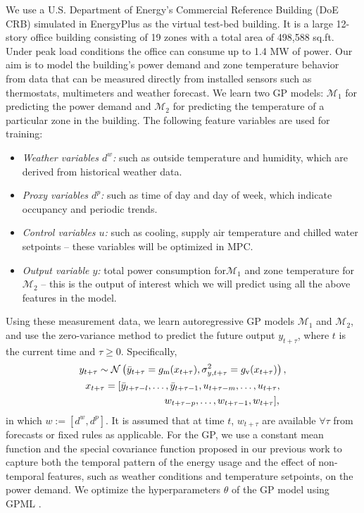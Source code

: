 We use a U.S. Department of Energy’s Commercial Reference Building (DoE CRB) simulated in EnergyPlus as the virtual test-bed building. It is a large 12-story office building consisting of 19 zones with a total area of 498,588 sq.ft. Under peak load conditions the office can consume up to 1.4 MW of power.
Our aim is to model the building's power demand and zone temperature behavior from data that can be measured directly from installed sensors such as thermostats, multimeters and weather forecast.
We learn two GP models: \(\mathcal{M}_1\) for predicting the power demand and \(\mathcal{M}_2\) for predicting the temperature of a particular zone in the building.
The following feature variables are used for training:
\begin{itemize}
\item \textit{Weather variables \(d^w\):} such as outside temperature and humidity, which are derived from historical weather data.
\item \textit{Proxy variables \(d^p\):} such as time of day and day of week, which indicate occupancy and periodic trends.
\item \textit{Control variables \(u\):} such as cooling, supply air temperature and chilled water setpoints -- these variables will be optimized in MPC.
\item \textit{Output variable \(y\):} total power consumption for\(\mathcal{M}_1\) and zone temperature for \(\mathcal{M}_2\) -- this is the output of interest which we will predict using all the above features in the model.
\end{itemize}

Using these measurement data, we learn autoregressive GP models \(\mathcal{M}_1\) and \(\mathcal{M}_2\), and use the zero-variance method to predict the future output \(y_{t+\tau}\), where $t$ is the current time and \( \tau \ge 0\).
Specifically,
\begin{gather}
\label{eq:dpc:prediction}
y_{t+\tau} \sim \operatorname*{\mathcal{N}}\left(\bar{y}_{t+\tau} = g_{\mathrm m}(x_{t+\tau}), \sigma^2_{y, t+\tau} = g_{\mathrm v}(x_{t+\tau})\right), \\
x_{t + \tau} = [\bar y_{t+ \tau-l}, \dots, \bar y_{t+ \tau-1}, u_{t+ \tau-m}, \dots, u_{t+ \tau}, \nonumber \\
\qquad\qquad\qquad\qquad  w_{t+ \tau-p}, \dots, w_{t+ \tau-1}, w_{t+ \tau}]\text, \nonumber
\end{gather}
in which \(w:=[d^w, d^p]\).
It is assumed that at time \(t\), \(w_{t+\tau}\) are available \(\forall \tau \) from forecasts or fixed rules as applicable.
For the GP, we use a constant mean function and the special covariance function proposed in our previous work \cite{nghiemetal16gp} to capture both the temporal pattern of the energy usage and the effect of non-temporal features, such as weather conditions and temperature setpoints, on the power demand.
We optimize the hyperparameters \(\theta\) %
of the GP model using GPML \cite{Rasmussen2010}.

